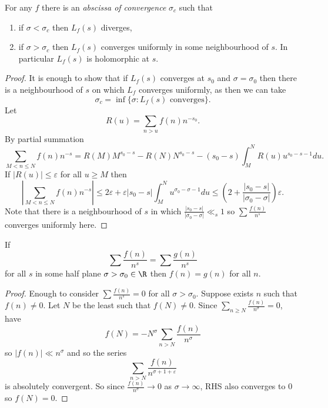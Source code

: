 \documentclass[a4paper]{article}
\theoremstyle{definition}
\begin{document}
\begin{lemma}
  For any \(f\) there is an \emph{abscissa of convergence} \(\sigma_c\) such that
  \begin{enumerate}
  \item if \(\sigma < \sigma_c\) then \(L_f(s)\) diverges,
  \item if \(\sigma > \sigma_c\) then \(L_f(s)\) converges uniformly in some neighbourhood of \(s\). In particular \(L_f(s)\) is holomorphic at \(s\).
  \end{enumerate}
\end{lemma}

\begin{proof}
  It is enough to show that if \(L_f(s)\) converges at \(s_0\) and \(\sigma = \sigma_0\) then there is a neighbourhood of \(s\) on which \(L_f\) converges uniformly, as then we can take
  \[
    \sigma_c = \inf \{\sigma: L_f(s) \text{ converges}\}.
  \]
  Let
  \[
    R(u) = \sum_{n > u} f(n) n^{-s_0}.
  \]
  By partial summation
  \[
    \sum_{M < n \leq N} f(n) n^{-s}
    = R(M) M^{s_0 - s} - R(N) N^{s_0 - s} - (s_0 - s) \int_M^N R(u) u^{s_0 - s - 1} du.
  \]
  If \(|R(u)| \leq \varepsilon\) for all \(u \geq M\) then
  \[
    \left| \sum_{M < n \leq N} f(n) n^{-s} \right|
    \leq 2\varepsilon + \varepsilon |s_0 - s| \int_M^N u^{\sigma_0 - \sigma - 1} du
    \leq (2 + \frac{|s_0 - s|}{|\sigma_0 - \sigma|}) \varepsilon.
  \]
  Note that there is a neighbourhood of \(s\) in which \(\frac{|s_0 - s|}{|\sigma_0 - \sigma|} \ll_s 1\) so \(\sum \frac{f(n)}{n^s}\) converges uniformly here.
\end{proof}

\begin{lemma}
  If
  \[
    \sum \frac{f(n)}{n^s} = \sum \frac{g(n)}{n^s}
  \]
  for all \(s\) in some half plane \(\sigma > \sigma_0 \in \R\) then \(f(n) = g(n)\) for all \(n\).
\end{lemma}

\begin{proof}
  Enough to consider \(\sum \frac{f(n)}{n^s} = 0\) for all \(\sigma > \sigma_0\). Suppose exists \(n\) such that \(f(n) \neq 0\). Let \(N\) be the least such that \(f(N) \neq 0\). Since \(\sum_{n \geq N} \frac{f(n)}{n^\sigma} = 0\), have
  \[
    f(N) = - N^\sigma \sum_{n > N} \frac{f(n)}{n^\sigma}
  \]
  so \(|f(n)| \ll n^\sigma\) and so the series
  \[
    \sum_{n > N} \frac{f(n)}{n^{\sigma + 1 + \varepsilon}}
    \]
    is absolutely convergent. So since \(\frac{f(n)}{n^\sigma} \to 0\) as \(\sigma \to \infty\), RHS also converges to \(0\) so \(f(N) = 0\).
\end{proof}
\end{document}
